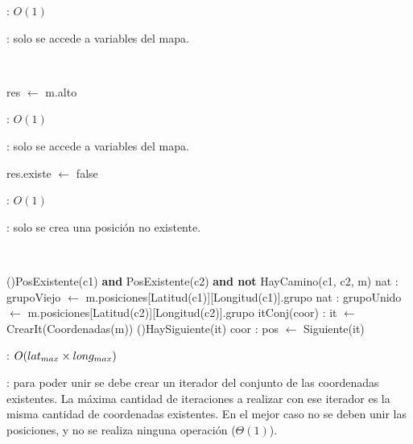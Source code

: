 \begin{Algoritmos}
	\complejidad: $O(1)$

	\justifcomp: solo se accede a variables del mapa.

	~

	\begin{algorithm}[H]
		\NoCaptionOfAlgo
		\caption{}
		res $\leftarrow$ m.alto
	\end{algorithm}

	\complejidad: $O(1)$

	\justifcomp: solo se accede a variables del mapa.



	\begin{algorithm}[H]
		\NoCaptionOfAlgo
		\BlankLine
		\caption{}
		res.existe $\leftarrow$ false
	\end{algorithm}

	\complejidad: $O(1)$

	\justifcomp: solo se crea una posición no existente.

	~

	\begin{algorithm}[H]
		\NoCaptionOfAlgo
		\caption{}
		\BlankLine
		\If(\OdeBloque{\compmatriz}){PosExistente(c1) \textbf{and} PosExistente(c2) \textbf{and not} HayCamino(c1, c2, m)}{
			nat : grupoViejo $\leftarrow$ m.posiciones[Latitud(c1)][Longitud(c1)].grupo
			nat : grupoUnido $\leftarrow$ m.posiciones[Latitud(c2)][Longitud(c2)].grupo
			itConj(coor) : it $\leftarrow$ CrearIt(Coordenadas(m))\OdeLinea{\compmatriz}
			\While(\OdeBloque{\compmatriz}){HaySiguiente(it)}{
				coor : pos $\leftarrow$ Siguiente(it)
			}
		}
	\end{algorithm}

	\complejidad: $O(lat_{max} \times long_{max})$

	\justifcomp: para poder unir se debe crear un iterador del conjunto de las coordenadas existentes. La máxima cantidad de iteraciones a realizar con ese iterador es la misma cantidad de coordenadas existentes. En el mejor caso no se deben unir las posiciones, y no se realiza ninguna operación ($\Theta(1)$).

\end{Algoritmos}